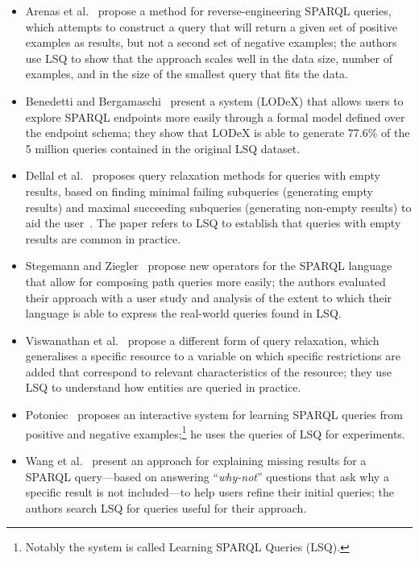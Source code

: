 \begin{itemize}
\item Arenas et al.~\cite{arenas2016reverse} propose a method for reverse-engineering SPARQL queries, which attempts to construct a query that will return a given set of positive examples as results, but not a second set of negative examples; the authors use LSQ to show that the approach scales well in the data size, number of examples, and in the size of the smallest query that fits the data. 
\item Benedetti and Bergamaschi~\cite{benedetti2016model} present a system (LODeX) that allows users to explore SPARQL endpoints more easily through a formal model defined over the endpoint schema; they show that LODeX is able to generate 77.6\% of the 5 million queries contained in the original LSQ dataset. 
\item Dellal et al.~\cite{dellal2017addressing} proposes query relaxation methods for queries with empty results, based on finding minimal failing subqueries (generating empty results) and maximal succeeding subqueries (generating non-empty results) to aid the user~\cite{FokouJHB17}. The paper refers to LSQ to establish that queries with empty results are common in practice.
\item Stegemann and Ziegler~\cite{stegemann2017investigating} propose new operators for the SPARQL language that allow for composing path queries more easily; the authors evaluated their approach with a user study and analysis of the extent to which their language is able to express the real-world queries found in LSQ.
\item Viswanathan et al.~\cite{Viswanathan18} propose a different form of query relaxation, which generalises a specific resource to a variable on which specific restrictions are added that correspond to relevant characteristics of the resource; they use LSQ to understand how entities are queried in practice. 
\item Potoniec~\cite{Potoniec19} proposes an interactive system for learning SPARQL queries from positive and negative examples;\footnote{Notably the system is called Learning SPARQL Queries (LSQ).} he uses the \dbpedia queries of LSQ for experiments. 
\item Wang et al.~\cite{wang2019answering} present an approach for explaining missing results for a SPARQL query---based on answering ``\textit{why-not}'' questions that ask why a specific result is not included---to help users refine their initial queries; the authors search LSQ for queries useful for their approach. 

\end{itemize}
